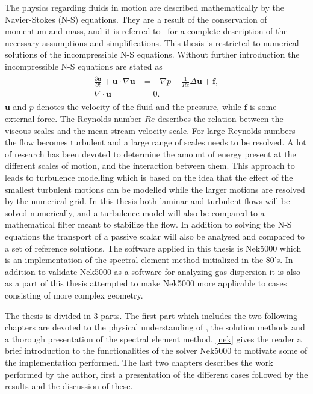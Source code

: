 The physics regarding fluids in motion are described mathematically by the Navier-Stokes (N-S) equations. 
They are a result of the conservation of momentum and mass, and it is referred to~\cite{White} for a complete 
description of the necessary assumptions and simplifications. 
This thesis is restricted to numerical solutions of the incompressible N-S equations.
Without further introduction the incompressible N-S equations are stated as  
%
\begin{align}
    \begin{split}
    \frac{\partial \mathbf{u}}{\partial t} + \mathbf{u}\cdot \nabla\mathbf{u} &= 
    -\nabla p + \frac{1}{Re} \Delta\mathbf{u} + \mathbf{f}, \\
		\nabla \cdot \mathbf{u} &= 0.
    \end{split}
	\label{eq:NS}
\end{align}
%
$\mathbf{u}$ and $p$ denotes the velocity of the fluid and the pressure, while $\mathbf{f}$ is some external force. 
The Reynolds number $Re$ describes the relation between the viscous scales and the mean stream velocity scale.
For large Reynolds numbers the flow becomes turbulent and a large range of scales needs to be resolved. A lot 
of research has been devoted to determine the amount of energy present at the different scales of motion, and 
the interaction between them. This approach to  leads to turbulence modelling which is based on the 
idea that the effect of the smallest turbulent motions can be modelled while the larger motions are resolved by 
the numerical grid. 
In this thesis both laminar and turbulent flows will be solved numerically, and a turbulence model will also 
be compared to a mathematical filter meant to stabilize the flow. In addition to solving the N-S equations the 
transport of a passive scalar will also be analysed and compared to a set of reference solutions. 
The software applied in this thesis is Nek5000 which is an implementation of the spectral element method initialized in the 80's.
In addition to validate Nek5000 as a software for analyzing gas dispersion it is also as a part of this thesis 
attempted to make Nek5000 more applicable to cases consisting of more complex geometry. 

The thesis is divided in 3 parts. The first part which includes the two following chapters are devoted to the physical understanding 
of , the solution methods and a thorough presentation of the spectral element method. \cref{nek} gives the reader a brief 
introduction to the functionalities of the solver Nek5000 to motivate some of the implementation performed. The last two chapters 
describes the work performed by the author, first a presentation of the different cases followed by the results and the discussion
of these.

